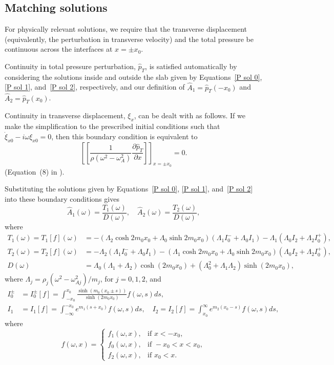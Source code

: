 \documentclass[12pt]{article}
\begin{document}
\subsection{Matching solutions}
For physically relevant solutions, we require that the transverse displacement (equivalently, the perturbation in transverse velocity) and the total pressure be continuous across the interfaces at $x = \pm x_0$.

Continuity in total pressure perturbation, $\hat{p}_T$, is satisfied automatically by considering the solutions inside and outside the slab given by Equations~\eqref{P sol 0}, \eqref{P sol 1}, and~\eqref{P sol 2}, respectively, and our definition of $\hat{A}_1 = \hat{p}_T(-x_0)$ and $\hat{A}_2 = \hat{p}_T(x_0)$.

Continuity in transverse displacement, $\xi_x$, can be dealt with as follows. If we make the simplification to the prescribed initial conditions such that $\dot{\xi}_{x0} - i\omega\xi_{x0} = 0$, then this boundary condition is equivalent to
\begin{equation}
\left[ \left[ \frac{1}{\rho(\omega^2 - \omega_A^2)} \frac{\partial \hat{p}_T}{\partial x} \right] \right]_{x=\pm x_0} = 0.
\end{equation}
(Equation~(8) in \cite{and_etal07}).

Substituting the solutions given by Equations~\eqref{P sol 0}, \eqref{P sol 1}, and~\eqref{P sol 2} into these boundary conditions gives
\begin{equation}
\hat{A}_1(\omega) = \frac{T_1(\omega)}{D(\omega)}, \quad \hat{A}_2(\omega) = \frac{T_2(\omega)}{D(\omega)},
\end{equation}
where
\begin{align}
T_1(\omega) = T_1[f](\omega) & = -(\Lambda_2\cosh{2m_0 x_0} + \Lambda_0\sinh{2m_0 x_0})(\Lambda_1 I_0^- + \Lambda_0 I_1) - \Lambda_1(\Lambda_0 I_2 + \Lambda_2 I_0^+), \\
T_2(\omega) = T_2[f](\omega) & = -\Lambda_2(\Lambda_1 I_0^- + \Lambda_0 I_1) - (\Lambda_1\cosh{2m_0 x_0} + \Lambda_0\sinh{2m_0 x_0})(\Lambda_0 I_2 + \Lambda_2 I_0^+), \\
D(\omega) & = \Lambda_0(\Lambda_1 + \Lambda_2)\cosh(2m_0x_0) + (\Lambda_0^2 + \Lambda_1\Lambda_2)\sinh(2m_0x_0),
\label{D}
\end{align}
where $\Lambda_j = \rho_j (\omega^2 - \omega_{Aj}^2) / m_j$, for $j = 0, 1, 2$, and
\begin{align}
I_0^\pm &= I_0^\pm[f] = \int_{-x_0}^{x_0} \frac{\sinh(m_0(x_0 \pm s))}{\sinh(2m_0x_0)} f(\omega, s) ds, \\
I_1 &= I_1[f] = \int_{-\infty}^{-x_0} e^{m_1(s + x_0)} f(\omega, s) ds,
\quad
I_2 = I_2[f] = \int_{x_0}^\infty e^{m_2(x_0 - s)} f(\omega, s) ds,
\end{align}
where
\begin{equation}
f(\omega, x) = \begin{cases}
f_1(\omega, x), &\text{if } x < -x_0, \\
f_0(\omega, x), &\text{if } -x_0 < x < x_0, \\
f_2(\omega, x), &\text{if } x_0 < x.
\end{cases}
\end{equation}
\end{document}
